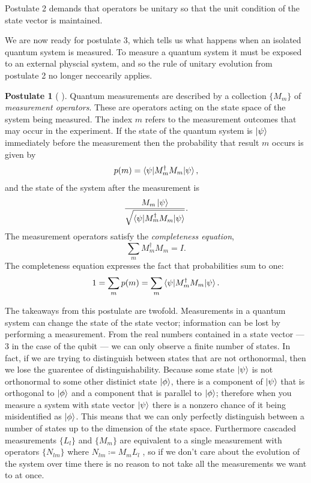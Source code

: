 \documentclass[12pt,twoside]{reedthesis}
\theoremstyle{plain}   %
\theoremstyle{definition}
\newtheorem{post}{Postulate}[section]
\theoremstyle{remark}
\numberwithin{equation}{section}
\begin{document}
  Postulate 2 demands that operators be unitary so that the unit condition of the state vector is maintained. \par
  We are now ready for postulate 3, which tells us what happens when an isolated quantum system is measured.
  To measure a quantum system it must be exposed to an external physcial system, and so the rule of unitary evolution from postulate 2 no longer neccearily applies.
  \begin{post}[{ \cite[2.2.3]{nielsen2010} }]
    Quantum measurements are described by a collection $\{M_m\}$ of \emph{measurement operators}.
    These are operators acting on the state space of the system being measured.
    The index $m$ refers to the measurement outcomes that may occur in the experiment.
    If the state of the quantum system is $\ket{\psi}$ immediately before the measurement then the probability that result $m$ occurs is given by
    \[ p(m) = \braket{ \psi | M_m^\dag M_m | \psi},\]
    and the state of the system after the measurement is
    \[ \dfrac{M_m \ket{\psi}}{\sqrt{\braket{\psi | M_m^\dag M_m | \psi}}}.\]
    The measurement operators satisfy the \emph{completeness equation},
    \[ \sum_m M_m^\dag M_m = I.\]
    The completeness equation expresses the fact that probabilities sum to one:
    \[ 1 = \sum_m p(m) = \sum_m \braket{\psi | M_m^\dag M_m | \psi}.\]
  \end{post}
  The takeaways from this postulate are twofold. Measurements in a quantum system can change the state of the state vector; information can be lost by performing a measurement.
  From the real numbers contained in a state vector --- 3 in the case of the qubit --- we can only observe a finite number of states.
  In fact, if we are trying to distinguish between states that are not orthonormal, then we lose the guarentee of distinguishability.
  Because some state $\ket{\psi}$ is not orthonormal to some other distinict state $\ket{\phi}$, there is a component of $\ket{\psi}$ that is orthogonal to $\ket{\phi}$ and a component
  that is parallel to $\ket{\phi}$; therefore when you measure a system with state vector $\ket{\psi}$ there is a nonzero chance of it being misidentified as $\ket{\phi}$.
  This means that we can only perfectly distinguish between a number of states up to the dimension of the state space.
  Furthermore cascaded measurements $\{L_l \}$ and $\{M_m\}$ are equivalent to a single measurement with operators $\{N_{lm}\}$ where $N_{lm} \coloneq M_m L_l$ \cite[2.57]{nielsen2010},
  so if we don't care about the evolution of the system over time there is no reason to not take all the measurements we want to at once. \par
\end{document}

